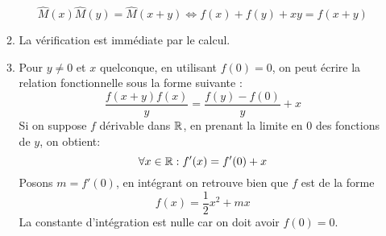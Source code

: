 \begin{enumerate}
\begin{enumerate}
\begin{displaymath}
 \widehat{M}(x)\widehat{M}(y)=\widehat{M}(x+y)
\Leftrightarrow
f(x)+f(y)+xy = f(x+y)
\end{displaymath}
\item La vérification est immédiate par le calcul.
\item Pour $y\neq 0$ et $x$ quelconque, en utilisant $f(0)=0$, on peut écrire la relation fonctionnelle sous la forme suivante :
\begin{displaymath}
 \frac{f(x+y)f(x)}{y}=\frac{f(y)-f(0)}{y}+x
\end{displaymath}
Si on suppose $f$ dérivable dans $\mathbb{R}$, en prenant la limite en $0$ des fonctions de $y$, on obtient:
\begin{displaymath}
 \forall x\in \mathbb{R} : f'(x)=f'(0)+x
\end{displaymath}
Posons $m=f'(0)$, en intégrant on retrouve bien que $f$ est de la forme
\begin{displaymath}
 f(x)= \frac{1}{2}x^2 +mx
\end{displaymath}
 La constante d'intégration est nulle car on doit avoir $f(0)=0$.
\end{enumerate}

\end{enumerate}
